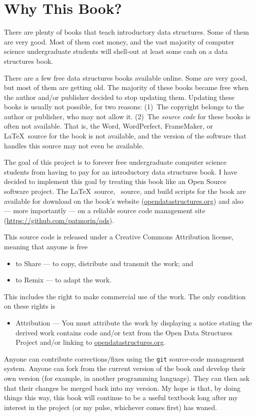 \chapter*{Why This Book?}

There are plenty of books that teach introductory data structures.
Some of them are very good.  Most of them cost money, and the vast
majority of computer science undergraduate students will shell-out at
least some cash on a data structures book.

There are a few free data structures books available online.  Some are
very good, but most of them are getting old.  The majority of these
books became free when the author and/or publisher decided to stop
updating them.  Updating these books is usually not possible, for two
reasons:  (1)~The copyright belongs to the author or publisher, who
may not allow it.  (2)~The \emph{source code} for these books is often
not available.  That is, the Word, WordPerfect, FrameMaker, or \LaTeX\
source for the book is not available, and the version of the software
that handles this source may not even be available.

The goal of this project is to forever free undergraduate computer
science students from having to pay for an introductory data structures
book.  I have decided to implement this goal by treating this book
like an Open Source software project.  The \LaTeX\ source, \lang\
source, and build scripts for the book are available for download
on the book's website (\url{opendatastructures.org}) and also ---
more importantly --- on a reliable source code management site
(\url{https://github.com/patmorin/ods}).

This source code is released under a Creative Commons Attribution license,
meaning that anyone is free
\begin{itemize}
  \item to Share --- to copy, distribute and transmit the work; and
  \item to Remix --- to adapt the work.
\end{itemize}
This includes the right to make commercial use of the work.  The only
condition on these rights is
\begin{itemize}
  \item Attribution --- You must attribute the work by displaying a
  notice stating the derived work contains code and/or text from the
  Open Data Structures Project and/or linking to
  \url{opendatastructures.org}.
\end{itemize}

Anyone can contribute corrections/fixes using the \texttt{git} source-code
management system.  Anyone can fork from the current version of the
book and develop their own version (for example, in another programming
language).  They can then ask that their changes be merged back into
my version.  My hope is that, by doing things this way, this book will
continue to be a useful textbook long after my interest in the project
(or my pulse, whichever comes first) has waned.


